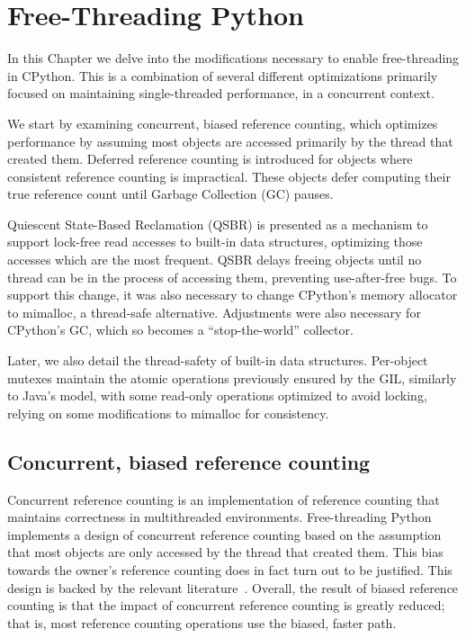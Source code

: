 \chapter{Free-Threading Python}\label{ch:free-threading-python}

In this Chapter we delve into the modifications necessary to enable free-thread\-ing in CPython.
This is a combination of several different optimizations primarily focused on maintaining single-threaded performance, in a concurrent context.

We start by examining concurrent, biased reference counting, which optimizes performance by assuming most objects are accessed primarily by the thread that created them.
Deferred reference counting is introduced for objects where consistent reference counting is impractical.
These objects defer computing their true reference count until Garbage Collection (GC) pauses.

Quiescent State-Based Reclamation (QSBR) is presented as a mechanism to support lock-free read accesses to built-in data structures, optimizing those accesses which are the most frequent.
QSBR delays freeing objects until no thread can be in the process of accessing them, preventing use-after-free bugs.
To support this change, it was also necessary to change CPython's memory allocator to mimalloc, a thread-safe alternative.
Adjustments were also necessary for CPython's GC, which so becomes a ``stop-the-world'' collector.

Later, we also detail the thread-safety of built-in data structures.
Per-object mutexes maintain the atomic operations previously ensured by the GIL, similarly to Java's model, with some read-only operations optimized to avoid locking, relying on some modifications to mimalloc for consistency.


\section{Concurrent, biased reference counting}\label{sec:concurrent-biased-reference-counting}

Concurrent reference counting is an implementation of reference counting that maintains correctness in multithreaded environments.
Free-threading Python implements a design of concurrent reference counting based on the assumption that most objects are only accessed by the thread that created them.
This bias towards the owner's reference counting does in fact turn out to be justified.
This design is backed by the relevant literature~\cite{biased-refcounting}.
Overall, the result of biased reference counting is that the impact of concurrent reference counting is greatly reduced; that is, most reference counting operations use the biased, faster path.

